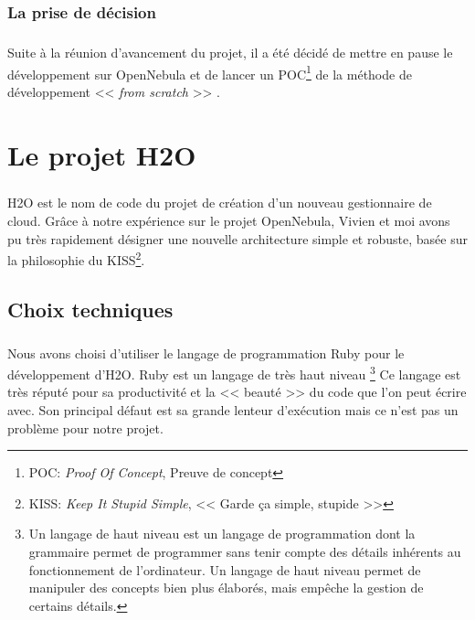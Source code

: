 \subsection{La prise de décision}
\paragraph*{}
Suite à la réunion d'avancement du projet, il a été décidé de mettre en pause le développement sur OpenNebula et de lancer un
POC\footnote{POC: \emph{Proof Of Concept}, Preuve de concept} de la méthode de développement << \emph{from scratch} >> .



\chapter{Le projet H2O}
\paragraph*{}
H2O est le nom de code du projet de création d'un nouveau gestionnaire de cloud.
Grâce à notre expérience sur le projet OpenNebula, Vivien et moi avons pu très rapidement désigner une nouvelle architecture
simple et robuste, basée sur la philosophie du KISS\footnote{KISS: \emph{Keep It Stupid Simple}, << Garde ça simple, stupide >>}.


\section{Choix techniques}
\paragraph*{}
Nous avons choisi d'utiliser le langage de programmation Ruby pour le développement d'H2O. Ruby est un langage de très haut niveau
\footnote{Un langage de haut niveau est un langage de programmation dont la grammaire permet de programmer sans tenir compte des détails inhérents au
fonctionnement de l'ordinateur. Un langage de haut niveau permet de manipuler des concepts bien plus élaborés, mais empêche la gestion de certains détails.}
Ce langage est très réputé pour sa productivité et la << beauté >> du code que l'on peut écrire avec. Son principal défaut est sa grande lenteur d'exécution
mais ce n'est pas un problème pour notre projet.

